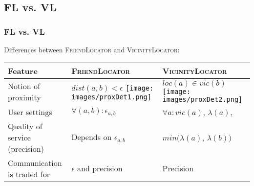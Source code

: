 \subsection{FL vs. VL}

\begin{frame}[red] %
\frametitle{FL vs. VL}
Differences between \textsc{FriendLocator} and \textsc{VicinityLocator}:
\begin{center}  
\begin{tabular}{| p{3cm} | p{3.5cm} | p{3.5cm} |}
\hline
\textbf{Feature}    & \textbf{\textsc{FriendLocator}}  & \textbf{\textsc{VicinityLocator}}   \\ 	  
  \hline
Notion of proximity & $dist(a,b)<\epsilon$   
\texttt{[image: images/proxDet1.png]}  & $loc(a) \in vic(b)$ \texttt{[image: images/proxDet2.png]} \\ 
\hline
User settings  & $\forall (a,b): \epsilon_{a,b}$ & $\forall a: vic(a)$, $\lambda(a)$,  \\
\hline
Quality of service (precision) & Depends on $\epsilon_{a,b}$	& $min(\lambda(a)$, $\lambda(b))$\\ 
  \hline	
Communication is traded for & $\epsilon$ and	precision & Precision   \\	
  \hline	
\end{tabular}
\end{center}	
\end{frame}
